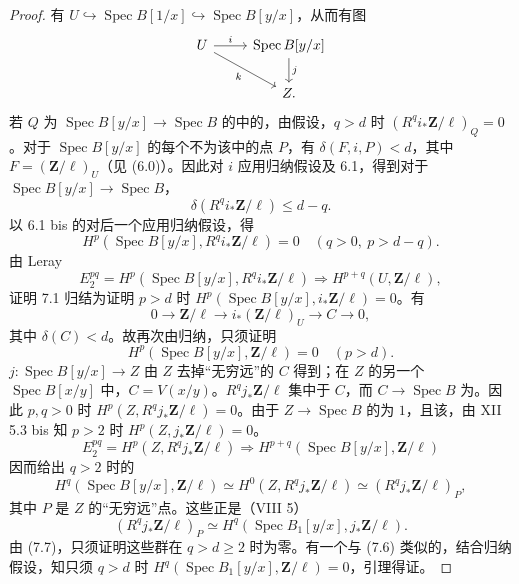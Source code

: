 \begin{proof}
有 $U\hookrightarrow\operatorname{Spec}B[1/x]\hookrightarrow\operatorname{Spec}B[y/x]$，从而有图
\[\begin{tikzcd}U\arrow[r,"i"]\arrow[dr,"k"']&\operatorname{Spec}B[y/x]\arrow[d,"j"]\\&Z.\end{tikzcd}\]
若 $Q$ 为 $\operatorname{Spec}B[y/x]\to\operatorname{Spec}B$ 的中的，由假设，$q>d$ 时 $(R^qi_*\mathbf Z/\ell)_Q=0$。对于 $\operatorname{Spec}B[y/x]$ 的每个不为该中的点 $P$，有 $\delta(F,i,P)<d$，其中 $F=(\mathbf Z/\ell)_U$（见 (6.0)）。因此对 $i$ 应用归纳假设及 6.1，得到对于 $\operatorname{Spec}B[y/x]\to\operatorname{Spec}B$，
\[\delta(R^qi_*\mathbf Z/\ell)\le d-q.\]
以 6.1 bis 的对后一个应用归纳假设，得
\[H^p(\operatorname{Spec}B[y/x],R^qi_*\mathbf Z/\ell)=0\quad(q>0,\ p>d-q).\]
由 Leray 
\[E_2^{pq}=H^p(\operatorname{Spec}B[y/x],R^qi_*\mathbf Z/\ell)\Longrightarrow H^{p+q}(U,\mathbf Z/\ell),\]
证明 7.1 归结为证明 $p>d$ 时 $H^p(\operatorname{Spec}B[y/x],i_*\mathbf Z/\ell)=0$。有
\[0\longrightarrow\mathbf Z/\ell\longrightarrow i_*(\mathbf Z/\ell)_U\longrightarrow C\longrightarrow0,\tag{7.6}\]
其中 $\delta(C)<d$。故再次由归纳，只须证明
\[H^p(\operatorname{Spec}B[y/x],\mathbf Z/\ell)=0\quad(p>d).\tag{7.7}\]
 $j:\operatorname{Spec}B[y/x]\to Z$ 由 $Z$ 去掉“无穷远”的 $C$ 得到；在 $Z$ 的另一个 $\operatorname{Spec}B[x/y]$ 中，$C=V(x/y)$。$R^qj_*\mathbf Z/\ell$ 集中于 $C$，而 $C\to\operatorname{Spec}B$ 为。因此 $p,q>0$ 时 $H^p(Z,R^qj_*\mathbf Z/\ell)=0$。由于 $Z\to\operatorname{Spec}B$ 的为 $1$，且该，由 XII 5.3 bis 知 $p>2$ 时 $H^p(Z,j_*\mathbf Z/\ell)=0$。
\[E_2^{pq}=H^p(Z,R^qj_*\mathbf Z/\ell)\Longrightarrow H^{p+q}(\operatorname{Spec}B[y/x],\mathbf Z/\ell)\]
因而给出 $q>2$ 时的
\[H^q(\operatorname{Spec}B[y/x],\mathbf Z/\ell)\simeq H^0(Z,R^qj_*\mathbf Z/\ell)\simeq(R^qj_*\mathbf Z/\ell)_P,\]
其中 $P$ 是 $Z$ 的“无穷远”点。这些正是（VIII 5）
\[(R^qj_*\mathbf Z/\ell)_P\simeq H^q(\operatorname{Spec}B_1[y/x],j_*\mathbf Z/\ell).\]
由 (7.7)，只须证明这些群在 $q>d\ge2$ 时为零。有一个与 (7.6) 类似的，结合归纳假设，知只须 $q>d$ 时 $H^q(\operatorname{Spec}B_1[y/x],\mathbf Z/\ell)=0$，引理得证。
\end{proof}
